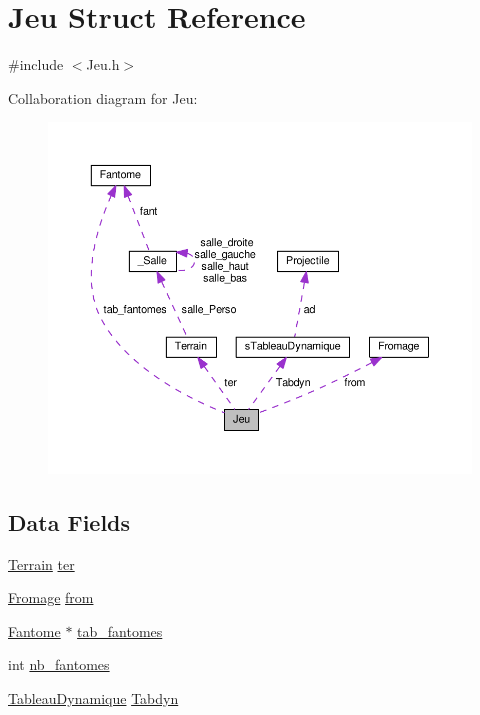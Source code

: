 \hypertarget{struct_jeu}{\section{Jeu Struct Reference}
\label{struct_jeu}
}


{\ttfamily \#include $<$Jeu.\-h$>$}



Collaboration diagram for Jeu\-:\nopagebreak
\begin{figure}[H]
\begin{center}
\leavevmode
\includegraphics[width=350pt]{struct_jeu__coll__graph}
\end{center}
\end{figure}
\subsection*{Data Fields}
\begin{DoxyCompactItemize}
\item 
\hyperlink{struct_terrain}{Terrain} \hyperlink{struct_jeu_ad8002797870fb7f9118f158aa1cba297}{ter}
\item 
\hyperlink{struct_fromage}{Fromage} \hyperlink{struct_jeu_ad750813cc55d2f02672d8197594350d4}{from}
\item 
\hyperlink{struct_fantome}{Fantome} $\ast$ \hyperlink{struct_jeu_aacb99c7d77e7b2be482dbf4be9d7f7cd}{tab\-\_\-fantomes}
\item 
int \hyperlink{struct_jeu_a2af79f2e5c4d4e38523422de3a02f380}{nb\-\_\-fantomes}
\item 
\hyperlink{_jeu_8h_a8248fdbab1c5aa4232c53c2f209f989a}{Tableau\-Dynamique} \hyperlink{struct_jeu_ac3c24a0cc9b72986a66bd7cd89c36b98}{Tabdyn}
\end{DoxyCompactItemize}


